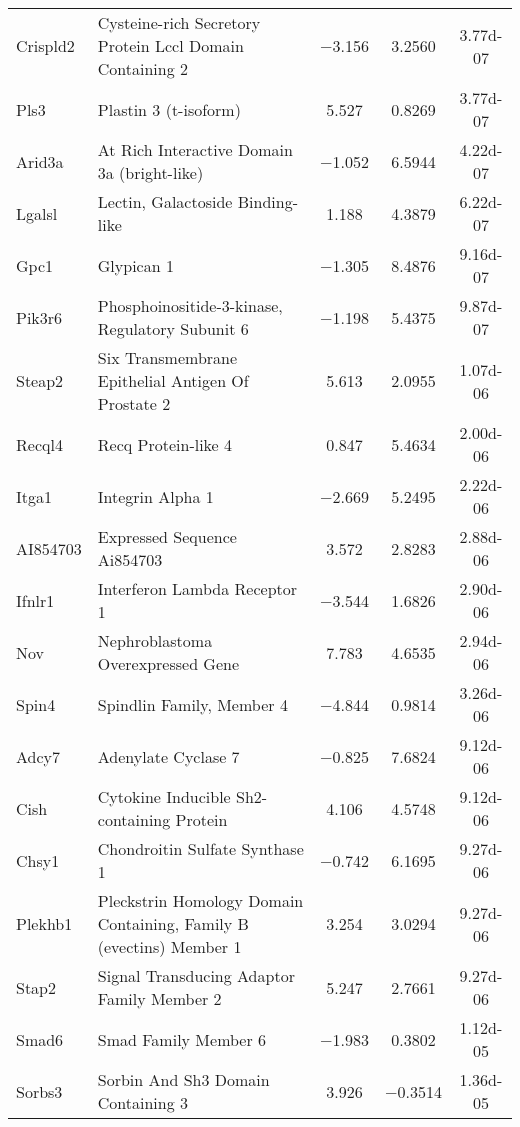 {\begin{longtable}[l]{p{2.5cm}p{6.6cm}ccc}
Crispld2	& Cysteine-rich Secretory Protein Lccl Domain Containing 2	& \num{-3.156}	& \num{ 3.2560}	& \num{3.77d-07}\\ 
Pls3	& Plastin 3 (t-isoform)	& \num{ 5.527}	& \num{ 0.8269}	& \num{3.77d-07}\\ 
Arid3a	& At Rich Interactive Domain 3a (bright-like)	& \num{-1.052}	& \num{ 6.5944}	& \num{4.22d-07}\\ 
Lgalsl	& Lectin, Galactoside Binding-like	& \num{ 1.188}	& \num{ 4.3879}	& \num{6.22d-07}\\ 
Gpc1	& Glypican 1	& \num{-1.305}	& \num{ 8.4876}	& \num{9.16d-07}\\ 
Pik3r6	& Phosphoinositide-3-kinase, Regulatory Subunit 6	& \num{-1.198}	& \num{ 5.4375}	& \num{9.87d-07}\\ 
Steap2	& Six Transmembrane Epithelial Antigen Of Prostate 2	& \num{ 5.613}	& \num{ 2.0955}	& \num{1.07d-06}\\ 
Recql4	& Recq Protein-like 4	& \num{ 0.847}	& \num{ 5.4634}	& \num{2.00d-06}\\ 
Itga1	& Integrin Alpha 1	& \num{-2.669}	& \num{ 5.2495}	& \num{2.22d-06}\\ 
AI854703	& Expressed Sequence Ai854703	& \num{ 3.572}	& \num{ 2.8283}	& \num{2.88d-06}\\ 
Ifnlr1	& Interferon Lambda Receptor 1	& \num{-3.544}	& \num{ 1.6826}	& \num{2.90d-06}\\ 
Nov	& Nephroblastoma Overexpressed Gene	& \num{ 7.783}	& \num{ 4.6535}	& \num{2.94d-06}\\ 
Spin4	& Spindlin Family, Member 4	& \num{-4.844}	& \num{ 0.9814}	& \num{3.26d-06}\\ 
Adcy7	& Adenylate Cyclase 7	& \num{-0.825}	& \num{ 7.6824}	& \num{9.12d-06}\\ 
Cish	& Cytokine Inducible Sh2-containing Protein	& \num{ 4.106}	& \num{ 4.5748}	& \num{9.12d-06}\\ 
Chsy1	& Chondroitin Sulfate Synthase 1	& \num{-0.742}	& \num{ 6.1695}	& \num{9.27d-06}\\ 
Plekhb1	& Pleckstrin Homology Domain Containing, Family B (evectins) Member 1	& \num{ 3.254}	& \num{ 3.0294}	& \num{9.27d-06}\\ 
Stap2	& Signal Transducing Adaptor Family Member 2	& \num{ 5.247}	& \num{ 2.7661}	& \num{9.27d-06}\\ 
Smad6	& Smad Family Member 6	& \num{-1.983}	& \num{ 0.3802}	& \num{1.12d-05}\\ 
Sorbs3	& Sorbin And Sh3 Domain Containing 3	& \num{ 3.926}	& \num{-0.3514}	& \num{1.36d-05}\\ 

\end{longtable}}

